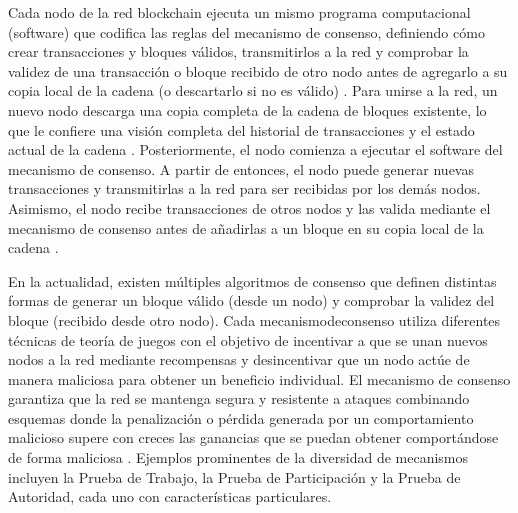 Cada \gls{nodo} de la red blockchain ejecuta un mismo programa computacional (\gls{software}) que codifica las reglas del mecanismo de consenso, definiendo cómo crear transacciones y bloques válidos, transmitirlos a la red y comprobar la validez de una transacción o bloque recibido de otro nodo antes de agregarlo a su copia local de la cadena (o descartarlo si no es válido) \cite{bartolomeo2020introduccion}. Para unirse a la red, un nuevo nodo descarga una copia completa de la cadena de bloques existente, lo que le confiere una visión completa del historial de transacciones y el estado actual de la cadena \cite{bulkowska2023implementation}. Posteriormente, el nodo comienza a ejecutar el software del mecanismo de consenso. A partir de entonces, el nodo puede generar nuevas transacciones y transmitirlas a la red para ser recibidas por los demás nodos. Asimismo, el nodo recibe transacciones de otros nodos y las valida mediante el mecanismo de consenso antes de añadirlas a un bloque en su copia local de la cadena \cite{bulkowska2023implementation}.

En la actualidad, existen múltiples algoritmos de consenso que definen distintas formas de generar un bloque válido (desde un nodo) y comprobar la validez del bloque (recibido desde otro nodo). Cada \gls{mecanismodeconsenso} utiliza diferentes técnicas de teoría de juegos con el objetivo de incentivar a que se unan nuevos nodos a la red mediante recompensas y desincentivar que un nodo actúe de manera maliciosa para obtener un beneficio individual. El mecanismo de consenso garantiza que la red se mantenga segura y resistente a ataques combinando esquemas donde la penalización o pérdida generada por un comportamiento malicioso supere con creces las ganancias que se puedan obtener comportándose de forma maliciosa \cite{satoshi2008bitcoin}. Ejemplos prominentes de la diversidad de mecanismos incluyen la Prueba de Trabajo, la Prueba de Participación y la Prueba de Autoridad, cada uno con características particulares.

